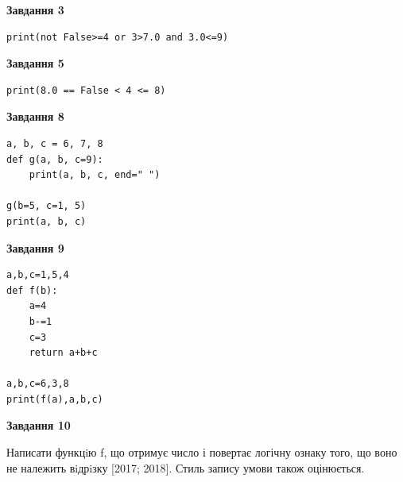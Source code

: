 \documentclass[12pt, ukrainian]{article}
\begin{document}
{\begin {large}
\begin{minipage}[t]{7.5cm}
\end{minipage}
\vline \hspace{6mm}
\begin{minipage}[t]{10.5cm}

\begin{center}
\textbf{Завдання 3}
\end{center}

\begin{verbatim}
print(not False>=4 or 3>7.0 and 3.0<=9)
\end{verbatim}



\begin{center}
\textbf{Завдання 5}
\end{center}

\begin{verbatim}
print(8.0 == False < 4 <= 8)
\end{verbatim}



\begin{center}
\textbf{Завдання 8}
\end{center}

\begin{verbatim}
a, b, c = 6, 7, 8
def g(a, b, c=9):
    print(a, b, c, end=" ")

g(b=5, c=1, 5)
print(a, b, c)
\end{verbatim}



\begin{center}
\textbf{Завдання 9}
\end{center}

\begin{verbatim}
a,b,c=1,5,4
def f(b):
    a=4
    b-=1
    c=3
    return a+b+c

a,b,c=6,3,8
print(f(a),a,b,c)
\end{verbatim}



\begin{center}
\textbf{Завдання 10}
\end{center}

Написати функцiю f, що отримує число і повертає логічну ознаку того, що воно не належить вiдрiзку [2017; 2018]. Стиль запису умови також оцінюється.\par

\end{minipage}

\end {large}}
\newpage
\end{document}
